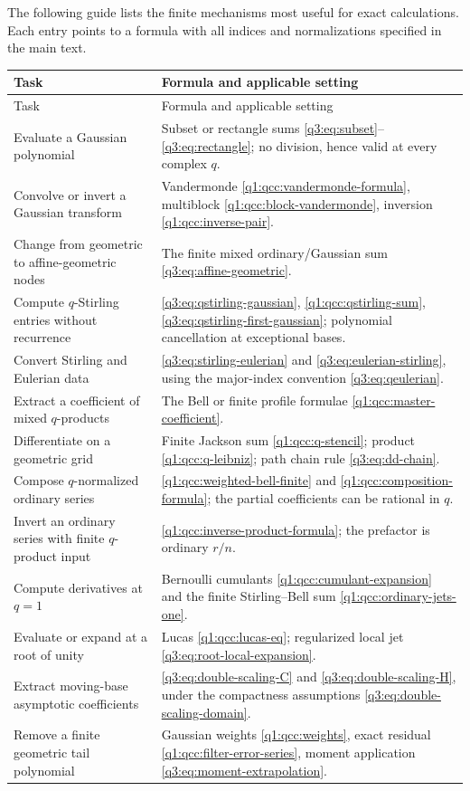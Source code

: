 \documentclass[11pt,a4paper,oneside,openany]{book}
\theoremstyle{definition}
\theoremstyle{remark}
\begin{document}
The following guide lists the finite mechanisms most useful for exact
calculations. Each entry points to a formula with all indices and
normalizations specified in the main text.
\begin{longtable}{@{}>{\raggedright\arraybackslash}p{}>{\raggedright\arraybackslash}p{}@{}}
\toprule
Task & Formula and applicable setting\\
\midrule
\endfirsthead
\toprule
Task & Formula and applicable setting\\
\midrule
\endhead
Evaluate a Gaussian polynomial & Subset or rectangle sums
\eqref{q3:eq:subset}--\eqref{q3:eq:rectangle}; no division, hence valid at every
complex $q$.\\[3pt]
Convolve or invert a Gaussian transform &
Vandermonde \eqref{q1:qcc:vandermonde-formula}, multiblock
\eqref{q1:qcc:block-vandermonde}, inversion \eqref{q1:qcc:inverse-pair}.\\[3pt]
Change from geometric to affine-geometric nodes &
The finite mixed ordinary/Gaussian sum \eqref{q3:eq:affine-geometric}.\\[3pt]
Compute $q$-Stirling entries without recurrence &
\eqref{q3:eq:qstirling-gaussian}, \eqref{q1:qcc:qstirling-sum},
\eqref{q3:eq:qstirling-first-gaussian}; polynomial cancellation at exceptional
bases.\\[3pt]
Convert Stirling and Eulerian data &
\eqref{q3:eq:stirling-eulerian} and \eqref{q3:eq:eulerian-stirling}, using the
major-index convention \eqref{q3:eq:qeulerian}.\\[3pt]
Extract a coefficient of mixed $q$-products &
The Bell or finite profile formulae
\eqref{q1:qcc:master-coefficient}.\\[3pt]
Differentiate on a geometric grid &
Finite Jackson sum \eqref{q1:qcc:q-stencil}; product
\eqref{q1:qcc:q-leibniz}; path chain rule \eqref{q3:eq:dd-chain}.\\[3pt]
Compose $q$-normalized ordinary series &
\eqref{q1:qcc:weighted-bell-finite} and \eqref{q1:qcc:composition-formula}; the partial
coefficients can be rational in $q$.\\[3pt]
Invert an ordinary series with finite $q$-product input &
\eqref{q1:qcc:inverse-product-formula}; the prefactor is
ordinary $r/n$.\\[3pt]
Compute derivatives at $q=1$ &
Bernoulli cumulants \eqref{q1:qcc:cumulant-expansion} and the finite
Stirling--Bell sum \eqref{q1:qcc:ordinary-jets-one}.\\[3pt]
Evaluate or expand at a root of unity &
Lucas \eqref{q1:qcc:lucas-eq}; regularized local jet
\eqref{q3:eq:root-local-expansion}.\\[3pt]
Extract moving-base asymptotic coefficients &
\eqref{q3:eq:double-scaling-C} and \eqref{q3:eq:double-scaling-H}, under the
compactness assumptions \eqref{q3:eq:double-scaling-domain}.\\[3pt]
Remove a finite geometric tail polynomial &
Gaussian weights \eqref{q1:qcc:weights}, exact residual
\eqref{q1:qcc:filter-error-series}, moment application
\eqref{q3:eq:moment-extrapolation}.\\
\bottomrule
\end{longtable}
\end{document}
